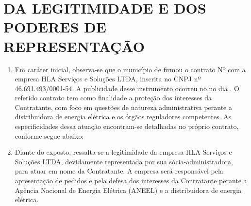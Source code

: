 \section{DA LEGITIMIDADE E DOS PODERES DE REPRESENTAÇÃO}

\begin{enumerate}
\item
  Em caráter inicial, observa-se que o município de \nomeMunicipio{} firmou o contrato Nº \numeroContrato{} com a empresa HLA Serviços e Soluções LTDA, inscrita no CNPJ nº 46.691.493/0001-54. A publicidade desse instrumento ocorreu no \publicacao{} no dia \dataPublicacao{}. O referido contrato tem como finalidade a proteção dos interesses da Contratante, com foco em questões de natureza administrativa perante a distribuidora de energia elétrica e os órgãos reguladores competentes. As especificidades dessa atuação encontram-se detalhadas no próprio contrato, conforme segue abaixo:
\Citacao{\clausula{}}
\item
  Diante do exposto, ressalta-se a legitimidade da empresa HLA Serviços e Soluções LTDA, devidamente representada por sua sócia-administradora, para atuar em nome da Contratante. A empresa será responsável pela apresentação de pedidos e pela defesa dos interesses da Contratante perante a Agência Nacional de Energia Elétrica (ANEEL) e a distribuidora de energia elétrica.
\end{enumerate}

